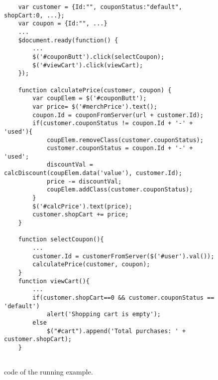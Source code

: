 \begin{figure}
\begin{lstlisting}
	var customer = {Id:"", couponStatus:"default", shopCart:0, ...};
	var coupon = {Id:"", ...}
	...
	$document.ready(function() {
		...
		$('#couponButt').click(selectCoupon);
		$('#viewCart').click(viewCart);
	});
	
	function calculatePrice(customer, coupon) {
		var coupElem = $('#couponButt');
		var price= $('#merchPrice').text();
		coupon.Id = couponFromServer(url + customer.Id);
		if(customer.couponStatus != coupon.Id + '-' + 'used'){
			coupElem.removeClass(customer.couponStatus);
			customer.couponStatus = coupon.Id + '-' + 'used';
			discountVal = calcDiscount(coupElem.data('value'), customer.Id);
			price -= discountVal;	
			coupElem.addClass(customer.couponStatus);
		} 	
		$('#calcPrice').text(price);
		customer.shopCart += price;
	}
	
	function selectCoupon(){
		...
		customer.Id = customerFromServer($('#user').val());
		calculatePrice(customer, coupon);
	}
	function viewCart(){
		...
		if(customer.shopCart==0 && customer.couponStatus == 'default')
			alert('Shopping cart is empty');
		else
			$("#cart").append('Total purchases: ' + customer.shopCart);
	}


\end{lstlisting}
\vspace{-0.1in} 

\caption{\javascript code of the running example.}
\label{Fig:example}
\vspace{-0.2in} 

\end{figure}